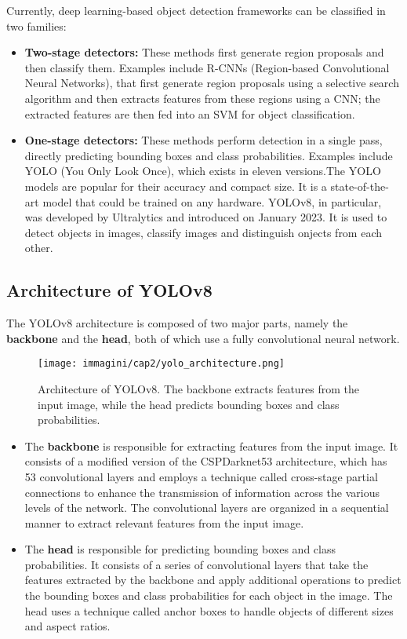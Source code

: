 Currently, deep learning-based object detection frameworks can be classified in two families: 
\begin{itemize}
    \item \textbf{Two-stage detectors:} These methods first generate region proposals and then classify them. Examples include R-CNNs (Region-based Convolutional Neural Networks), that first generate region proposals using a selective search algorithm and then extracts features from these regions using a CNN; the extracted features are then fed into an SVM for object classification. 
    \item \textbf{One-stage detectors:} These methods perform detection in a single pass, directly predicting bounding boxes and class probabilities. Examples include YOLO (You Only Look Once), which exists in eleven versions.The YOLO models are popular for their accuracy and compact size. It is a state-of-the-art model that could be trained on any hardware. YOLOv8, in particular, was developed by Ultralytics and introduced on January 2023. It is used to detect objects in images, classify images and distinguish onjects from each other. 

\end{itemize}

\subsection{Architecture of YOLOv8}
The YOLOv8 architecture is composed of two major parts, namely the \textbf{backbone} and the \textbf{head}, both of which use a fully convolutional neural network. 
\begin{figure}[!ht]
    \centering
    \texttt{[image: immagini/cap2/yolo\_architecture.png]}
    \caption{Architecture of YOLOv8. The backbone extracts features from the input image, while the head predicts bounding boxes and class probabilities.}
    \label{fig:yolo_architecture}
\end{figure}
\begin{itemize}
    \item The \textbf{backbone} is responsible for extracting features from the input image. It consists of a modified version of the CSPDarknet53 architecture, which has 53 convolutional layers and employs a technique called cross-stage partial connections to enhance the transmission of information across the various levels of the network. The convolutional layers are organized in a sequential manner to extract relevant features from the input image.
    \item The \textbf{head} is responsible for predicting bounding boxes and class probabilities. It consists of a series of convolutional layers that take the features extracted by the backbone and apply additional operations to predict the bounding boxes and class probabilities for each object in the image. The head uses a technique called anchor boxes to handle objects of different sizes and aspect ratios.
\end{itemize}


